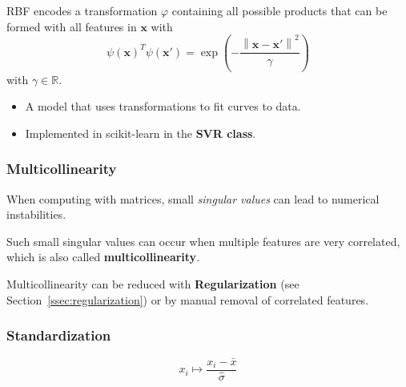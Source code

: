 
RBF encodes a transformation $\varphi$ containing all possible products that can be formed with all features in $\mathbf{x}$ with
\begin{equation*}
    {\psi(\mathbf{x})}^T\psi(\mathbf{x}')=\exp\left(-\frac{\left\|\mathbf{x}-\mathbf{x}'\right\|^{2}}{\gamma}\right)
\end{equation*}
with $\gamma \in \mathbb{R}$.


\begin{itemize}
    \item A model that uses transformations to fit curves to data.
    \item Implemented in scikit-learn in the \textbf{SVR class}.
\end{itemize}


\subsubsection{Multicollinearity}
When computing with matrices, small \textit{singular values} can lead to numerical instabilities.

Such small singular values can occur when multiple features are very correlated, which is also called \textbf{multicollinearity}.

Multicollinearity can be reduced with \textbf{Regularization} (see Section\ \ref{ssec:regularization}) or by manual removal of correlated features.

\subsubsection{Standardization}
\noindent\begin{equation*}
    x_i\mapsto\frac{x_i-\bar{x}}{\widehat{\sigma}}
\end{equation*}
